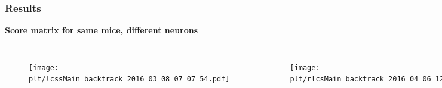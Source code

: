 \documentclass{beamer}
\newcommand{\plt}{../../plots}
\begin{document}
\begin{frame}
    \frametitle{Results}
    \textbf{Score matrix for same mice, different neurons}
    \begin{columns}[c]
    \begin{figure}
    \texttt{[image: \\plt/lcssMain\_backtrack\_2016\_03\_08\_07\_07\_54.pdf]}
    \end{figure}

    \begin{figure}
    \texttt{[image: \\plt/rlcsMain\_backtrack\_2016\_04\_06\_12\_54\_14.pdf]}
    \end{figure}
    \end{columns}
\end{frame}
\end{document}
